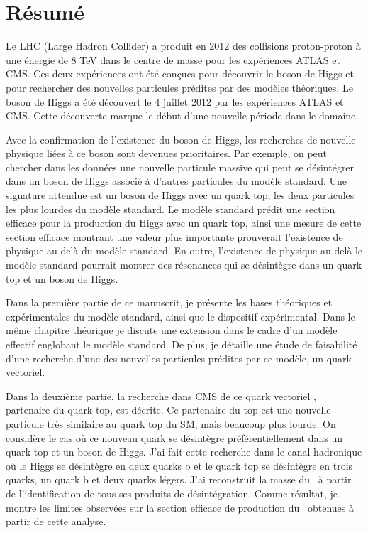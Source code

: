 \begin{otherlanguage}{francais}
\chapter*{R\'{e}sum\'{e}}

Le LHC (Large Hadron Collider) a produit en 2012 des collisions proton-proton à une énergie de 8 TeV  dans le centre de masse pour les expériences ATLAS et CMS. Ces deux expériences ont été conçues pour découvrir le boson de Higgs et pour rechercher des nouvelles particules prédites par des modèles théoriques. Le boson de Higgs a été découvert le 4 juillet 2012 par les expériences ATLAS et CMS. Cette découverte marque le début  d'une nouvelle période dans le domaine. 

Avec la confirmation de l'existence du boson de Higgs, les recherches de nouvelle physique liées à ce boson sont devenues prioritaires. Par exemple, on peut chercher dans les données une nouvelle particule massive qui peut se désintégrer dans un boson de Higgs associé à d'autres particules du modèle standard. Une signature attendue est un boson de Higgs avec un quark top, les deux particules les plus lourdes du modèle standard. Le modèle standard prédit une section efficace pour la production du Higgs avec un quark top, ainsi une mesure de cette section efficace montrant une valeur plus importante prouverait l'existence de physique au-delà du modèle standard. En outre, l'existence de physique au-delà le modèle standard pourrait montrer des résonances qui se désintègre dans un quark top et un boson de Higgs.

Dans la première partie de ce manuscrit, je présente les bases théoriques et expérimentales du modèle standard, ainsi que le dispositif expérimental. Dans le même chapitre théorique je discute une extension dans le cadre d'un modèle effectif englobant le modèle standard. De plus, je détaille une étude de faisabilité d'une recherche d'une des nouvelles particules prédites par ce modèle, un quark vectoriel.

Dans la deuxième partie, la recherche dans CMS de ce quark vectoriel \Tp,  partenaire du quark top, est décrite. Ce partenaire du top est une nouvelle particule très similaire au quark top du SM, mais beaucoup plus lourde. On considère le cas où ce nouveau quark se désintègre préférentiellement dans un quark top et un boson de Higgs. J'ai fait cette recherche dans le canal hadronique où le Higgs se désintègre en deux quarks b et le quark top se désintègre en trois quarks, un quark b et deux quarks légers. J'ai reconstruit la masse du \Tp~à partir de l'identification de tous ses produits de désintégration. Comme résultat, je montre les limites observées sur la section efficace de production du \Tp~obtenues à partir de cette analyse.
\end{otherlanguage}  

\endgroup